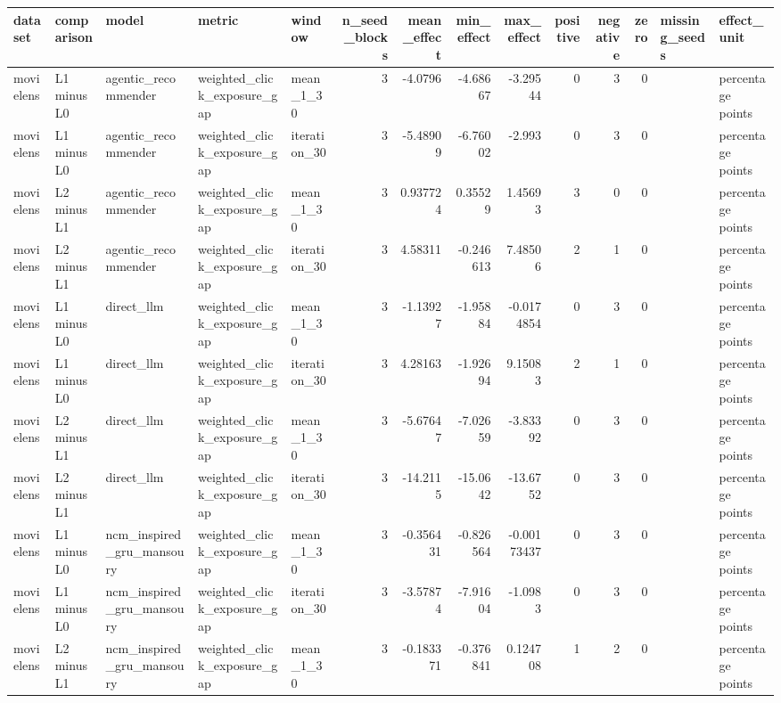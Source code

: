 \begin{table}[htbp!]
\centering
\small
\setlength{\tabcolsep}{3pt}
\renewcommand{\arraystretch}{1.1}
\begin{tabular}{lllllrrrrrrrll}
\hline
dataset & comparison & model & metric & window & n\_seed\_blocks & mean\_effect & min\_effect & max\_effect & positive & negative & zero & missing\_seeds & effect\_unit \\
\hline
movielens & L1 minus L0 & agentic\_recommender & weighted\_click\_exposure\_gap & mean\_1\_30 & 3 & -4.0796 & -4.68667 & -3.29544 & 0 & 3 & 0 &  & percentage points \\
movielens & L1 minus L0 & agentic\_recommender & weighted\_click\_exposure\_gap & iteration\_30 & 3 & -5.48909 & -6.76002 & -2.993 & 0 & 3 & 0 &  & percentage points \\
movielens & L2 minus L1 & agentic\_recommender & weighted\_click\_exposure\_gap & mean\_1\_30 & 3 & 0.937724 & 0.35529 & 1.45693 & 3 & 0 & 0 &  & percentage points \\
movielens & L2 minus L1 & agentic\_recommender & weighted\_click\_exposure\_gap & iteration\_30 & 3 & 4.58311 & -0.246613 & 7.48506 & 2 & 1 & 0 &  & percentage points \\
movielens & L1 minus L0 & direct\_llm & weighted\_click\_exposure\_gap & mean\_1\_30 & 3 & -1.13927 & -1.95884 & -0.0174854 & 0 & 3 & 0 &  & percentage points \\
movielens & L1 minus L0 & direct\_llm & weighted\_click\_exposure\_gap & iteration\_30 & 3 & 4.28163 & -1.92694 & 9.15083 & 2 & 1 & 0 &  & percentage points \\
movielens & L2 minus L1 & direct\_llm & weighted\_click\_exposure\_gap & mean\_1\_30 & 3 & -5.67647 & -7.02659 & -3.83392 & 0 & 3 & 0 &  & percentage points \\
movielens & L2 minus L1 & direct\_llm & weighted\_click\_exposure\_gap & iteration\_30 & 3 & -14.2115 & -15.0642 & -13.6752 & 0 & 3 & 0 &  & percentage points \\
movielens & L1 minus L0 & ncm\_inspired\_gru\_mansoury & weighted\_click\_exposure\_gap & mean\_1\_30 & 3 & -0.356431 & -0.826564 & -0.00173437 & 0 & 3 & 0 &  & percentage points \\
movielens & L1 minus L0 & ncm\_inspired\_gru\_mansoury & weighted\_click\_exposure\_gap & iteration\_30 & 3 & -3.57874 & -7.91604 & -1.0983 & 0 & 3 & 0 &  & percentage points \\
movielens & L2 minus L1 & ncm\_inspired\_gru\_mansoury & weighted\_click\_exposure\_gap & mean\_1\_30 & 3 & -0.183371 & -0.376841 & 0.124708 & 1 & 2 & 0 &  & percentage points \\

\end{tabular}
\end{table}
